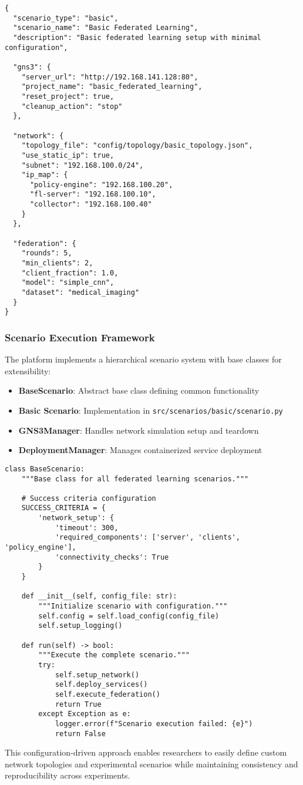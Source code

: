 \begin{lstlisting}[style=jsoncode, caption=Basic Scenario Configuration (basic\_main.json)]
{
  "scenario_type": "basic",
  "scenario_name": "Basic Federated Learning",
  "description": "Basic federated learning setup with minimal configuration",
  
  "gns3": {
    "server_url": "http://192.168.141.128:80",
    "project_name": "basic_federated_learning",
    "reset_project": true,
    "cleanup_action": "stop"
  },
  
  "network": {
    "topology_file": "config/topology/basic_topology.json",
    "use_static_ip": true,
    "subnet": "192.168.100.0/24",
    "ip_map": {
      "policy-engine": "192.168.100.20",
      "fl-server": "192.168.100.10",
      "collector": "192.168.100.40"
    }
  },
  
  "federation": {
    "rounds": 5,
    "min_clients": 2,
    "client_fraction": 1.0,
    "model": "simple_cnn",
    "dataset": "medical_imaging"
  }
}
\end{lstlisting}

\subsubsection{Scenario Execution Framework}

The platform implements a hierarchical scenario system with base classes for extensibility:

\begin{itemize}
    \item \textbf{BaseScenario}: Abstract base class defining common functionality
    \item \textbf{Basic Scenario}: Implementation in \texttt{src/scenarios/basic/scenario.py}
    \item \textbf{GNS3Manager}: Handles network simulation setup and teardown
    \item \textbf{DeploymentManager}: Manages containerized service deployment
\end{itemize}

\begin{lstlisting}[style=pythoncode, caption=Scenario Execution Structure]
class BaseScenario:
    """Base class for all federated learning scenarios."""
    
    # Success criteria configuration
    SUCCESS_CRITERIA = {
        'network_setup': {
            'timeout': 300,
            'required_components': ['server', 'clients', 'policy_engine'],
            'connectivity_checks': True
        }
    }
    
    def __init__(self, config_file: str):
        """Initialize scenario with configuration."""
        self.config = self.load_config(config_file)
        self.setup_logging()
        
    def run(self) -> bool:
        """Execute the complete scenario."""
        try:
            self.setup_network()
            self.deploy_services()
            self.execute_federation()
            return True
        except Exception as e:
            logger.error(f"Scenario execution failed: {e}")
            return False
\end{lstlisting}

This configuration-driven approach enables researchers to easily define custom network topologies and experimental scenarios while maintaining consistency and reproducibility across experiments.
